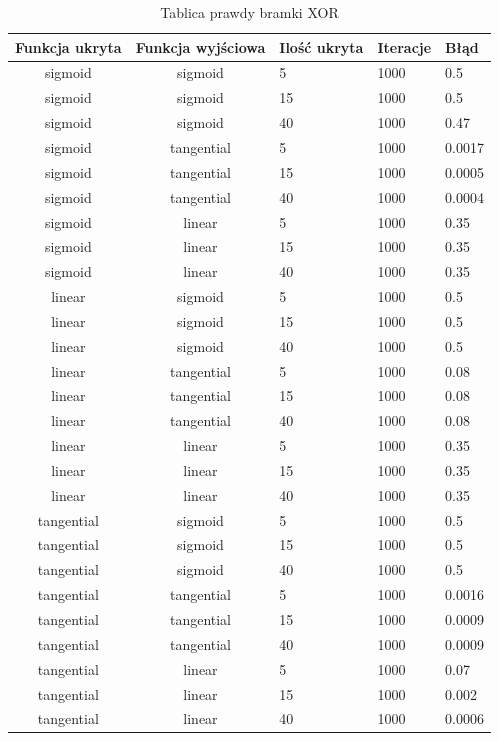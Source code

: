 \documentclass[pointlessnumbers, abstracton, headsepline, a4paper]{scrartcl}
\begin{document}
\begin{table}[h]
\centering
\begin{tabular}[t]{c|c|l|l|l}
Funkcja ukryta & Funkcja wyjściowa & Ilość ukryta & Iteracje & Błąd \\
\hline
sigmoid & sigmoid & 5 & 1000 & 0.5 \\
sigmoid & sigmoid & 15 & 1000 & 0.5 \\
sigmoid & sigmoid & 40 & 1000 & 0.47 \\
sigmoid & tangential & 5 & 1000 & 0.0017 \\
sigmoid & tangential & 15 & 1000 & 0.0005 \\
sigmoid & tangential & 40 & 1000 & 0.0004 \\
sigmoid & linear & 5 & 1000 & 0.35 \\
sigmoid & linear & 15 & 1000 & 0.35 \\
sigmoid & linear & 40 & 1000 & 0.35 \\
linear & sigmoid & 5 & 1000 & 0.5 \\
linear & sigmoid & 15 & 1000 & 0.5 \\
linear & sigmoid & 40 & 1000 & 0.5 \\
linear & tangential & 5 & 1000 & 0.08 \\
linear & tangential & 15 & 1000 & 0.08 \\
linear & tangential & 40 & 1000 & 0.08 \\
linear & linear & 5 & 1000 & 0.35 \\
linear & linear & 15 & 1000 & 0.35 \\
linear & linear & 40 & 1000 & 0.35 \\
tangential & sigmoid & 5 & 1000 & 0.5 \\
tangential & sigmoid & 15 & 1000 & 0.5 \\
tangential & sigmoid & 40 & 1000 & 0.5 \\
tangential & tangential & 5 & 1000 & 0.0016 \\
tangential & tangential & 15 & 1000 & 0.0009 \\
tangential & tangential & 40 & 1000 & 0.0009 \\
tangential & linear & 5 & 1000 & 0.07 \\
tangential & linear & 15 & 1000 & 0.002 \\
tangential & linear & 40 & 1000 & 0.0006 \\
\end{tabular}
\caption{\label{tab:xor}Tablica prawdy bramki XOR}
\end{table}
\end{document}
